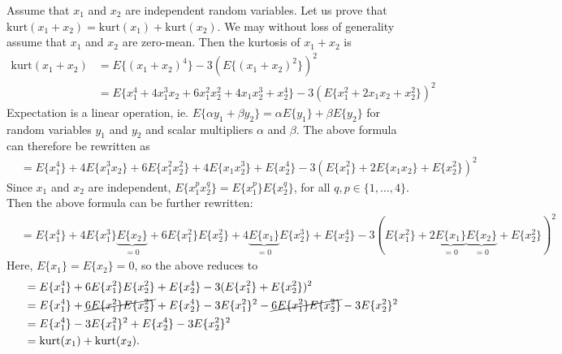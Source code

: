 \begin{enumerate}
\begin{solution}
    Assume that $x_1$ and $x_2$ are independent random variables.
    Let us prove that $\mathrm{kurt}(x_1+x_2)=\mathrm{kurt}(x_1)+\mathrm{kurt}(x_2)$.
    We may without loss of generality assume that $x_1$ and $x_2$ are zero-mean.
    Then the kurtosis of $x_1+x_2$ is
    \begin{align*}
      \mathrm{kurt}(x_1+x_2) &= E\{(x_1+x_2)^4\}-3(E\{(x_1+x_2)^2\})^2
      \\
      &= E\{x_1^4 + 4 x_1^3 x_2 + 6 x_1^2 x_2^2 + 4 x_1 x_2^3 +
      x_2^4\} -3(E\{x_1^2 + 2 x_1 x_2 + x_2^2\})^2
    \end{align*}
    Expectation is a linear operation, ie. $E\{\alpha y_1+ \beta
    y_2\}=\alpha E\{y_1\}+ \beta E\{y_2\}$ for random variables $y_1$
    and $y_2$ and scalar multipliers $\alpha$ and $\beta$.  The above
    formula can therefore be rewritten as
    \begin{align*}
      &= E\{x_1^4\} + 4 E\{x_1^3 x_2\} + 6 E\{x_1^2 x_2^2\} + 4 E\{x_1
      x_2^3\} + E\{x_2^4\} -3(E\{x_1^2\} + 2 E\{x_1 x_2\} +
      E\{x_2^2\})^2
    \end{align*}
    Since $x_1$ and $x_2$ are independent, $E\{x_1^p x_2^q\} =
    E\{x_1^p\} E\{x_2^q\}$, for all $q,p \in \{1,\ldots,4\}$.  Then
    the above formula can be further rewritten:
    \begin{align*}
      &= E\{x_1^4\} + 4 E\{x_1^3\}\underbrace{E\{x_2\}}_{=0} + 6
      E\{x_1^2\}E\{x_2^2\} + 4 \underbrace{E\{x_1\}}_{=0}E\{x_2^3\} +
      E\{x_2^4\} -3(E\{x_1^2\} + 2
      \underbrace{E\{x_1\}}_{=0}\underbrace{E\{x_2\}}_{=0} +
      E\{x_2^2\})^2
    \end{align*}
    Here, $E\{x_1\}=E\{x_2\}=0$, so the above reduces to
    \begin{align*}
      &= E\{x_1^4\} + 6 E\{x_1^2\}E\{x_2^2\} + E\{x_2^4\}
      -3(E\{x_1^2\} + E\{x_2^2\})^2
      \\
      &= E\{x_1^4\} + \cancel{6 E\{x_1^2\}E\{x_2^2\}} + E\{x_2^4\} -3
      E\{x_1^2\}^2 - \cancel{6 E\{x_1^2\} E\{x_2^2\}} -3 E\{x_2^2\}^2
      \\
      &=E\{x_1^4\} -3 E\{x_1^2\}^2 + E\{x_2^4\} -3 E\{x_2^2\}^2
      \\
      &= \mathrm{kurt}(x_1) + \mathrm{kurt}(x_2) .
    \end{align*}
    

\end{solution}
\end{enumerate}
